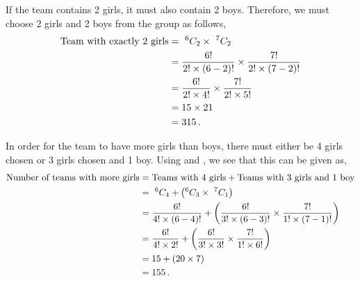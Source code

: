\begin{subquestions}
\begin{subsubquestions}

\subsubquestion

If the team contains 2 girls, it must also contain 2 boys. Therefore, we must choose 2 girls and 2 boys from the group as follows,
\begin{align}
	\text{Team with exactly 2 girls} & = ~^6C_2 \times ~^7C_2 \nonumber \\
	                                 & = \frac{6!}{2! \times (6-2)!} \times \frac{7!}{2! \times (7-2)!} \nonumber \\
	                                 & = \frac{6!}{2! \times 4!} \times \frac{7!}{2! \times 5!} \nonumber \\
	                                 & = 15 \times 21 \nonumber \\
	                                 & = 315 \,.
\end{align}


\subsubquestion

In order for the team to have more girls than boys, there must either be 4 girls chosen or 3 girls chosen and 1 boy. Using  and , we see that this can be given as,
\begin{align}
	\text{Number of teams with more girls} & = \text{Teams with 4 girls} + \text{Teams with 3 girls and 1 boy} \nonumber \\
	                                       & = ~^6C_4 + \left(^6C_3 \times ~^7C_1 \right) \nonumber \\
	                                       & = \frac{6!}{4! \times (6-4)!} + \left(\frac{6!}{3! \times (6-3)!} \times \frac{7!}{1! \times (7-1)!} \right) \nonumber \\
	                                       & = \frac{6!}{4! \times 2!} + \left(\frac{6!}{3! \times 3!} \times \frac{7!}{1! \times 6!} \right) \nonumber \\
	                                       & = 15 + (20 \times 7) \nonumber \\
	                                       & = 155 \,.
\end{align}

\end{subsubquestions}



\end{subquestions}
